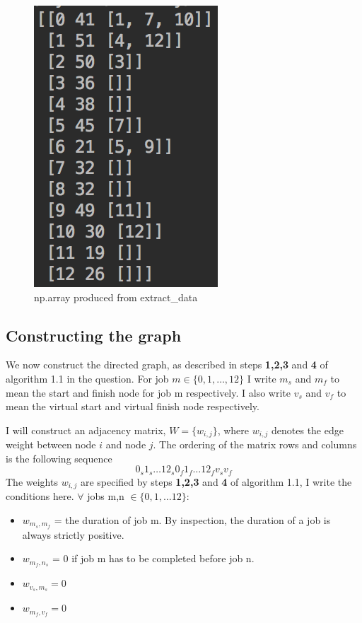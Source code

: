 \documentclass[paper=a4, fontsize=12pt]{scrartcl} %
\numberwithin{equation}{section}       %
\numberwithin{figure}{section}         %
\numberwithin{table}{section}          %
\begin{document}
\begin{figure}[h]
\caption{np.array produced from extract\_data}
\centering
\includegraphics{data}
\end{figure}

\subsection{Constructing the graph}
We now construct the directed graph, as described in steps \textbf{1,2,3} and \textbf{4} of algorithm 1.1 in the question. For job $m \in \{ 0,1,\dots, 12 \}$ I write $m_{s}$ and $m_{f}$ to mean the start and finish node for job m respectively. I also write $v_{s}$ and $v_{f}$ to mean the virtual start and virtual finish node respectively.

I will construct an adjacency matrix, $W = \{ w_{i,j} \}$, where $w_{i,j}$ denotes the edge weight between node $i$ and node $j$. The ordering of the matrix rows and columns is the following sequence $$ 0_{s} 1_{s} \dots 12_{s} 0_{f} 1_{f} \dots 12_{f} v_{s} v_{f}$$
The weights $w_{i,j}$ are specified by steps \textbf{1,2,3} and \textbf{4} of algorithm 1.1, I write the conditions here. $\forall$ jobs m,n $\in \{ 0,1,\dots 12\}$:
\begin{itemize}
  \item $w_{m_{s},m_{f}}$ = the duration of job m. By inspection, the duration of a job is always strictly positive.
  \item $w_{m_{f},n_{s}}$ = 0 if job m has to be completed before job n.
  \item $w_{v_{s},m_{s}} = 0$
  \item $w_{m_{f},v_{f}} = 0$
\end{itemize}
\end{document}
